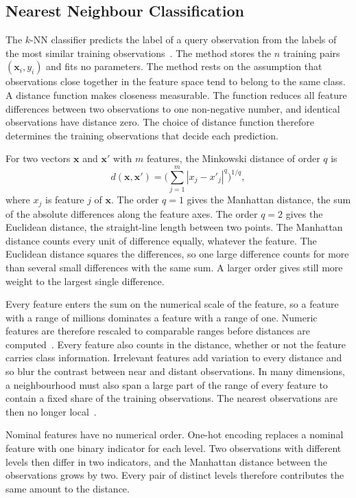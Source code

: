 \documentclass[conference]{IEEEtran}
\newcommand{\knn}{\mbox{$k$-NN}}
\begin{document}
\subsection{Nearest Neighbour Classification}
The \knn{} classifier predicts the label of a query observation from the labels of the most similar training observations~\cite{cover1967}. The method stores the $n$ training pairs $(\mathbf{x}_i, y_i)$ and fits no parameters. The method rests on the assumption that observations close together in the feature space tend to belong to the same class. A distance function makes closeness measurable. The function reduces all feature differences between two observations to one non-negative number, and identical observations have distance zero. The choice of distance function therefore determines the training observations that decide each prediction.

For two vectors $\mathbf{x}$ and $\mathbf{x}'$ with $m$ features, the Minkowski distance of order $q$ is
\begin{equation}
    d(\mathbf{x},\mathbf{x}') = \Big(\sum_{j=1}^{m} |x_j - x'_j|^{q}\Big)^{1/q},
\end{equation}
where $x_j$ is feature $j$ of $\mathbf{x}$. The order $q=1$ gives the Manhattan distance, the sum of the absolute differences along the feature axes. The order $q=2$ gives the Euclidean distance, the straight-line length between two points. The Manhattan distance counts every unit of difference equally, whatever the feature. The Euclidean distance squares the differences, so one large difference counts for more than several small differences with the same sum. A larger order gives still more weight to the largest single difference.

Every feature enters the sum on the numerical scale of the feature, so a feature with a range of millions dominates a feature with a range of one. Numeric features are therefore rescaled to comparable ranges before distances are computed~\cite{hastie2009}. Every feature also counts in the distance, whether or not the feature carries class information. Irrelevant features add variation to every distance and so blur the contrast between near and distant observations. In many dimensions, a neighbourhood must also span a large part of the range of every feature to contain a fixed share of the training observations. The nearest observations are then no longer local~\cite{hastie2009}.

Nominal features have no numerical order. One-hot encoding replaces a nominal feature with one binary indicator for each level. Two observations with different levels then differ in two indicators, and the Manhattan distance between the observations grows by two. Every pair of distinct levels therefore contributes the same amount to the distance.
\end{document}
